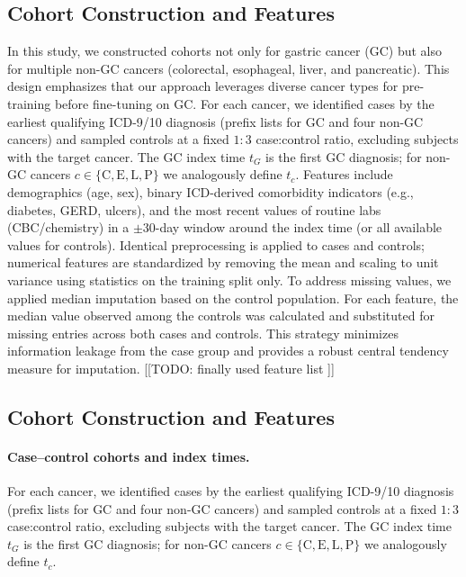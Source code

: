 \documentclass[journal,article,submit,pdftex,moreauthors]{Definitions/mdpi}
\begin{document}
\subsection{Cohort Construction and Features}
In this study, we constructed cohorts not only for gastric cancer (GC) but also for multiple non-GC cancers (colorectal, esophageal, liver, and pancreatic).
This design emphasizes that our approach leverages diverse cancer types for pre-training before fine-tuning on GC.
For each cancer, we identified cases by the earliest qualifying ICD-9/10 diagnosis (prefix lists for GC and four non-GC cancers) and sampled controls at a fixed $1{:}3$ case:control ratio, excluding subjects with the target cancer.
The GC index time $t_G$ is the first GC diagnosis; for non-GC cancers $c\in\{\mathrm{C},\mathrm{E},\mathrm{L},\mathrm{P}\}$ we analogously define $t_c$.
Features include demographics (age, sex), binary ICD-derived comorbidity indicators (e.g., diabetes, GERD, ulcers), and the most recent values of routine labs (CBC/chemistry) in a $\pm 30$-day window around the index time (or all available values for controls).
Identical preprocessing is applied to cases and controls; numerical features are standardized by removing the mean and scaling to unit variance using statistics on the training split only.
To address missing values, we applied median imputation based on the control population. 
For each feature, the median value observed among the controls was calculated and substituted for missing entries across both cases and controls. 
This strategy minimizes information leakage from the case group and provides a robust central tendency measure for imputation.
[[TODO: finally used feature list ]]


\subsection{Cohort Construction and Features}

\paragraph{Case--control cohorts and index times.}
For each cancer, we identified cases by the earliest qualifying ICD-9/10 diagnosis (prefix lists for GC and four non-GC cancers) and sampled controls at a fixed $1{:}3$ case:control ratio, excluding subjects with the target cancer. The GC index time $t_G$ is the first GC diagnosis; for non-GC cancers $c\in\{\mathrm{C},\mathrm{E},\mathrm{L},\mathrm{P}\}$ we analogously define $t_c$.
\end{document}
